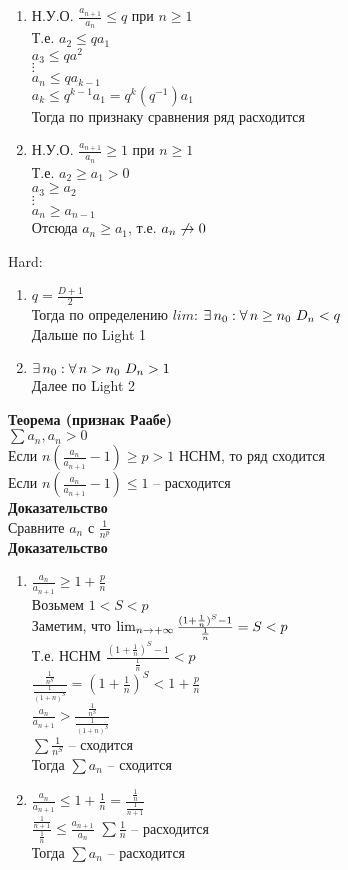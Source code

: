 \documentclass[12pt]{article}
\begin{document}
\begin{enumerate}
    \item Н.У.О. $\frac{a_{n+1}}{a_n} \leq q$ при $n \geq 1$\\
    Т.е. $a_2 \leq qa_1$\\
    $a_3 \leq qa^2$\\
    $\vdots$\\
    $a_n \leq qa_{k-1}$\\
    $a_k \leq q^{k-1} a_1 = q^k(q^{-1})a_1$\\
    Тогда по признаку сравнения ряд расходится
    \item Н.У.О. $\frac{a_{n+1}}{a_n} \geq 1$ при $n \geq 1$\\
    Т.е. $a_2 \geq a_1 > 0$\\
    $a_3 \geq a_2$\\
    $\vdots$\\
    $a_n \geq a_{n-1}$\\
    Отсюда $a_n \geq a_1$, т.е. $a_n \not\rightarrow 0$
\end{enumerate}
Hard:
\begin{enumerate}
    \item $q = \frac{D+1}2$\\
    Тогда по определению $lim$: $\exists\, n_0: \forall\, n \geq n_0\ D_n < q$\\
    Дальше по Light 1
    \item $\exists\, n_0: \forall\, n > n_0\ D_n > 1$\\
    Далее по Light 2
\end{enumerate}
\textbf{Теорема (признак Раабе)}\\
$\sum a_n, a_n > 0$\\
Если $n(\frac{a_n}{a_{n+1}} - 1) \geq p > 1$ НСНМ, то ряд сходится\\
Если $n(\frac{a_n}{a_{n+1}} - 1) \leq 1$ -- расходится\\
\textbf{Доказательство}\\
Сравните $a_n$ с $\frac1{n^p}$\\
\textbf{Доказательство}
\begin{enumerate}
    \item $\frac{a_n}{a_{n+1}}\geq 1 + \frac pn$\\
    Возьмем $1 < S < p$\\
    Заметим, что $\lim_{n\rightarrow +\infty} \frac{(1+\frac1n)^S-1}{\frac1n} = S < p$\\
    Т.е. НСНМ $\frac{(1+\frac1n)^S-1}{\frac1n} < p$\\
    $\frac{\frac1{n^S}}{\frac1{(1+n)^S}}=(1+\frac1n)^S < 1 + \frac pn$\\
    $\frac{a_n}{a_{n+1}} > \frac{\frac1{n^S}}{\frac1{(1+n)^S}}$\\
    $\sum \frac1{n^S}$ -- сходится\\
    Тогда $\sum a_n$ -- сходится
    \item $\frac{a_n}{a_{n+1}} \leq 1+\frac1n = \frac{\frac1n}{\frac1{n+1}}$\\
    $\frac{\frac1{n+1}}{\frac1n} \leq \frac{a_{n+1}}{a_n}$
    $\sum \frac1n$ -- расходится\\
    Тогда $\sum a_n$ -- расходится
\end{enumerate}
\end{document}
